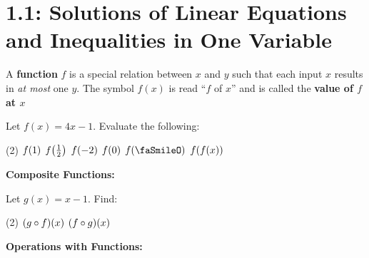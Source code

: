 \documentclass[../mathNotesPreamble]{subfiles}
\begin{document}
  \section{1.1: Solutions of Linear Equations and Inequalities in One Variable}
  \begin{defn*}
    A \textbf{function} $f$ is a special relation between $x$ and $y$ such that each input $x$ results in \emph{at most} one $y$. The symbol $f(x)$ is read ``$f$ of $x$'' and is called the \textbf{value of $f$ at $x$}
  \end{defn*}
  \vspace*{0\baselineskip}
  \begin{ex*}
    Let $f(x)=4x-1$. Evaluate the following:
    \begin{extasks}[after-item-skip=\stretch{1}](2)
      \task $f{\left(1\right)}$
      \task $f{\left(\frac{1}{2}\right)}$
      \task $f{\left(-2\right)}$
      \task $f{\left(0\right)}$
      \task $f(\textnormal{\faSmileO})$
      \task $f{\left(f(x)\right)}$
    \end{extasks}
  \end{ex*}

  \noindent\textbf{Composite Functions:}

  \noindent{}
  \begin{ex*}
    Let $g(x)=x-1$. Find:
    \begin{extasks}[after-item-skip=\stretch{1}](2)
      \task ${\left(g\circ f\right)}(x)$
      \task ${\left(f\circ g\right)}(x)$
    \end{extasks}
  \end{ex*}

  \pagebreak
  \noindent\textbf{Operations with Functions:}

  \noindent{}
\end{document}
